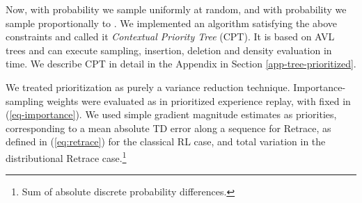 \documentclass{article}
\begin{document}
Now, with probability 
 we sample uniformly at random, and with probability  
we sample proportionally to .
We implemented an algorithm 
satisfying the above constraints and called it \textit{Contextual Priority 
Tree} (CPT). It is based on AVL trees 
\citep{velskii1976avl} and can execute sampling, insertion, deletion and 
density evaluation in  time. We describe CPT in detail 
in the Appendix in Section \ref{app-tree-prioritized}.

We treated prioritization as purely a variance reduction technique. 
Importance-sampling weights were evaluated as in prioritized 
experience replay, with fixed  in (\ref{eq-importance}). We 
used simple gradient magnitude estimates as priorities, corresponding to a mean 
absolute TD error along a sequence for Retrace, as defined in (\ref{eq:retrace}) 
for the classical RL case, and total variation 
in the distributional Retrace case.\footnote{Sum of absolute discrete probability differences.}
\end{document}
